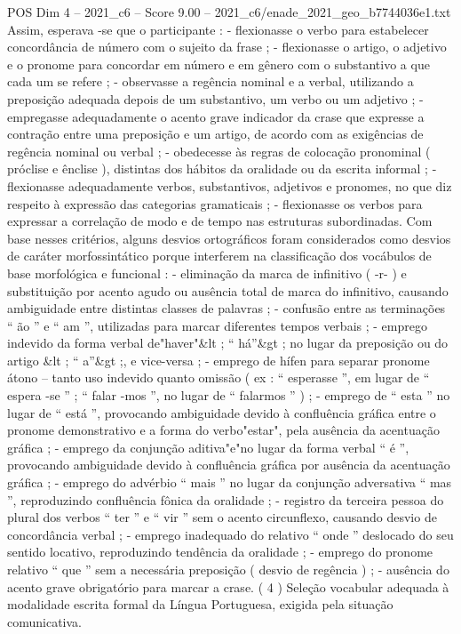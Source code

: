 \begin{textsample}{POS Dim 4 – 2021\_c6 – Score 9.00 – 2021\_c6/enade\_2021\_geo\_b7744036e1.txt}
Assim, esperava -se que o participante : - flexionasse o verbo para estabelecer concordância de número com o sujeito da frase ; - flexionasse o artigo, o adjetivo e o pronome para concordar em número e em gênero com o substantivo a que cada um se refere ; - observasse a regência nominal e a verbal, utilizando a preposição adequada depois de um substantivo, um verbo ou um adjetivo ; - empregasse adequadamente o acento grave indicador da crase que expresse a contração entre uma preposição e um artigo, de acordo com as exigências de regência nominal ou verbal ; - obedecesse às regras de colocação pronominal ( próclise e ênclise ), distintas dos hábitos da oralidade ou da escrita informal ; - flexionasse adequadamente verbos, substantivos, adjetivos e pronomes, no que diz respeito à expressão das categorias gramaticais ; - flexionasse os verbos para expressar a correlação de modo e de tempo nas estruturas subordinadas.
Com base nesses critérios, alguns desvios ortográficos foram considerados como desvios de caráter morfossintático porque interferem na classificação dos vocábulos de base morfológica e funcional : - eliminação da marca de infinitivo ( -r- ) e substituição por acento agudo ou ausência total de marca do infinitivo, causando ambiguidade entre distintas classes de palavras ; - confusão entre as terminações “ ão ” e “ am ”, utilizadas para marcar diferentes tempos verbais ; - emprego indevido da forma verbal de"haver"\&lt ; “ há”\&gt ; no lugar da preposição ou do artigo \&lt ; “ a”\&gt ;, e vice-versa ; - emprego de hífen para separar pronome átono – tanto uso indevido quanto omissão ( ex : “ esperasse ”, em lugar de “ espera -se ” ; “ falar -mos ”, no lugar de “ falarmos ” ) ; - emprego de “ esta ” no lugar de “ está ”, provocando ambiguidade devido à confluência gráfica entre o pronome demonstrativo e a forma do verbo"estar", pela ausência da acentuação gráfica ; - emprego da conjunção aditiva"e"no lugar da forma verbal “ é ”, provocando ambiguidade devido à confluência gráfica por ausência da acentuação gráfica ; - emprego do advérbio “ mais ” no lugar da conjunção adversativa “ mas ”, reproduzindo confluência fônica da oralidade ; - registro da terceira pessoa do plural dos verbos “ ter ” e “ vir ” sem o acento circunflexo, causando desvio de concordância verbal ; - emprego inadequado do relativo “ onde ” deslocado do seu sentido locativo, reproduzindo tendência da oralidade ; - emprego do pronome relativo “ que ” sem a necessária preposição ( desvio de regência ) ; - ausência do acento grave obrigatório para marcar a crase. ( 4 ) Seleção vocabular adequada à modalidade escrita formal da Língua Portuguesa, exigida pela situação comunicativa.

\end{textsample}
